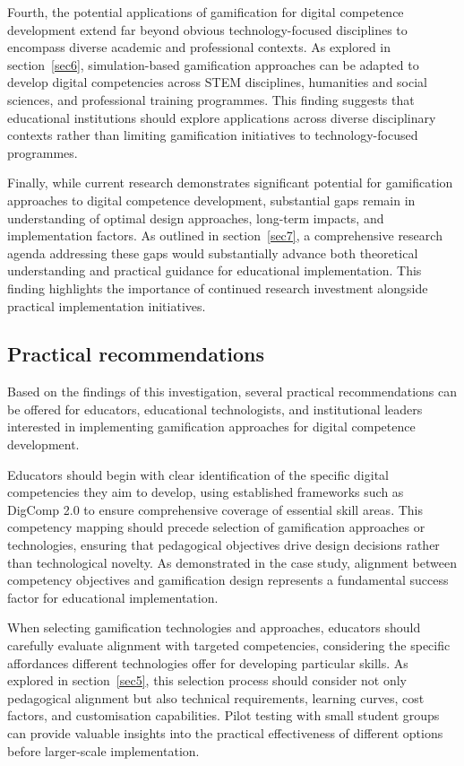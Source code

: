 \documentclass[cte]{acnsart}
\begin{document}
Fourth, the potential applications of gamification for digital competence development extend far beyond obvious technology-focused disciplines to encompass diverse academic and professional contexts. As explored in section~\ref{sec6}, simulation-based gamification approaches can be adapted to develop digital competencies across STEM disciplines, humanities and social sciences, and professional training programmes. This finding suggests that educational institutions should explore applications across diverse disciplinary contexts rather than limiting gamification initiatives to technology-focused programmes.

Finally, while current research demonstrates significant potential for gamification approaches to digital competence development, substantial gaps remain in understanding of optimal design approaches, long-term impacts, and implementation factors. As outlined in section~\ref{sec7}, a comprehensive research agenda addressing these gaps would substantially advance both theoretical understanding and practical guidance for educational implementation. This finding highlights the importance of continued research investment alongside practical implementation initiatives.

\subsection{Practical recommendations}

Based on the findings of this investigation, several practical recommendations can be offered for educators, educational technologists, and institutional leaders interested in implementing gamification approaches for digital competence development.

Educators should begin with clear identification of the specific digital competencies they aim to develop, using established frameworks such as DigComp 2.0 to ensure comprehensive coverage of essential skill areas. This competency mapping should precede selection of gamification approaches or technologies, ensuring that pedagogical objectives drive design decisions rather than technological novelty. As demonstrated in the case study, alignment between competency objectives and gamification design represents a fundamental success factor for educational implementation.

When selecting gamification technologies and approaches, educators should carefully evaluate alignment with targeted competencies, considering the specific affordances different technologies offer for developing particular skills. As explored in section~\ref{sec5}, this selection process should consider not only pedagogical alignment but also technical requirements, learning curves, cost factors, and customisation capabilities. Pilot testing with small student groups can provide valuable insights into the practical effectiveness of different options before larger-scale implementation.
\end{document}

